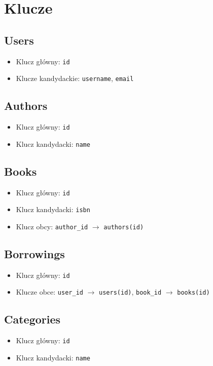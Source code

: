 \documentclass{article}
\begin{document}
\section*{Klucze}
\subsection*{Users}
\begin{itemize}
    \item Klucz główny: \texttt{id}
    \item Klucze kandydackie: \texttt{username}, \texttt{email}
\end{itemize}

\subsection*{Authors}
\begin{itemize}
    \item Klucz główny: \texttt{id}
    \item Klucz kandydacki: \texttt{name}
\end{itemize}

\subsection*{Books}
\begin{itemize}
    \item Klucz główny: \texttt{id}
    \item Klucz kandydacki: \texttt{isbn}
    \item Klucz obcy: \texttt{author\_id} \(\rightarrow\) \texttt{authors(id)}
\end{itemize}

\subsection*{Borrowings}
\begin{itemize}
    \item Klucz główny: \texttt{id}
    \item Klucze obce: \texttt{user\_id} \(\rightarrow\) \texttt{users(id)}, \texttt{book\_id} \(\rightarrow\) \texttt{books(id)}
\end{itemize}

\subsection*{Categories}
\begin{itemize}
    \item Klucz główny: \texttt{id}
    \item Klucz kandydacki: \texttt{name}
\end{itemize}
\end{document}
